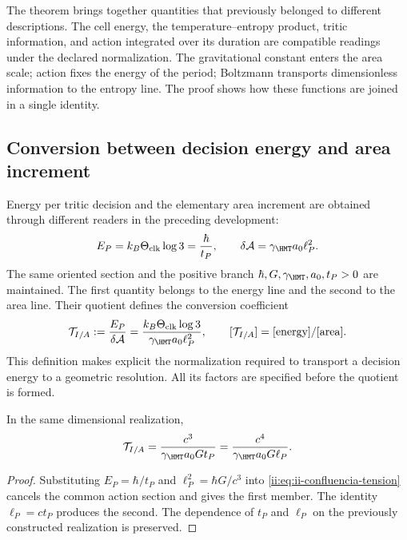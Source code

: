 The theorem brings together quantities that previously belonged to different
descriptions. The cell energy, the temperature--entropy product,
tritic information, and action integrated over its duration are
compatible readings under the declared normalization. The gravitational
constant enters the area scale; action fixes the energy
of the period; Boltzmann transports dimensionless information to the
entropy line. The proof shows how these functions are
joined in a single identity.

\subsection{Conversion between decision energy and area increment}
\label{ii:sec:ii-conversion-informacion-area}

Energy per tritic decision and the elementary area increment are
obtained through different readers in the preceding development:
\begin{equation}
 E_P=k_B\Theta_{\rm clk}\log3=\frac{\hbar}{t_P},
 \qquad
 \delta\mathcal A=\gamma_{\HMT}a_0\ell_P^2.
 \label{ii:eq:ii-confluencia-cuanto-energia-area}
\end{equation}
The same oriented section and the positive branch
\(\hbar,G,\gamma_{\HMT},a_0,t_P>0\) are maintained. The first quantity
belongs to the energy line and the second to the area line.
Their quotient defines the conversion coefficient
\begin{equation}
 \mathcal T_{I/A}
 :=\frac{E_P}{\delta\mathcal A}
 =\frac{k_B\Theta_{\rm clk}\log3}
        {\gamma_{\HMT}a_0\ell_P^2},
 \qquad [\mathcal T_{I/A}]=[\text{energy}]/[\text{area}].
 \label{ii:eq:ii-confluencia-tension}
\end{equation}
This definition makes explicit the normalization required to transport
a decision energy to a geometric resolution. All its factors
are specified before the quotient is formed.

\begin{proposition}
\label{ii:prop:ii-confluencia-tension}
In the same dimensional realization,
\begin{equation}
 \mathcal T_{I/A}
 =\frac{c^3}{\gamma_{\HMT}a_0G t_P}
 =\frac{c^4}{\gamma_{\HMT}a_0G\ell_P}.
 \label{ii:eq:ii-confluencia-tension-gravedad}
\end{equation}
\end{proposition}
\begin{proof}
Substituting \(E_P=\hbar/t_P\) and \(\ell_P^2=\hbar G/c^3\)
into \eqref{ii:eq:ii-confluencia-tension} cancels the common action
section and gives the first member. The identity \(\ell_P=ct_P\)
produces the second. The dependence of \(t_P\) and
\(\ell_P\) on the previously constructed realization is preserved.
\end{proof}


